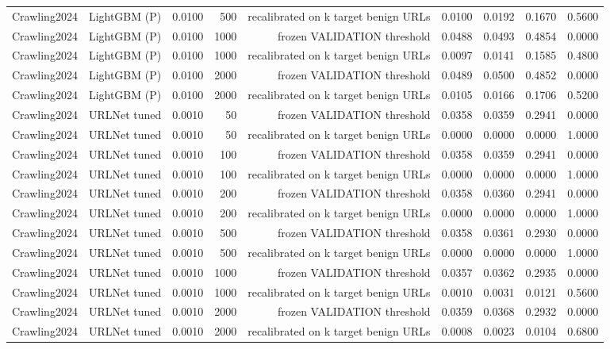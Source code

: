 \begin{table}[t]
\begin{tabular}{llrrrrrrr}
Crawling2024 & LightGBM (P) & 0.0100 & 500 & recalibrated on k target benign URLs & 0.0100 & 0.0192 & 0.1670 & 0.5600 \\
Crawling2024 & LightGBM (P) & 0.0100 & 1000 & frozen VALIDATION threshold & 0.0488 & 0.0493 & 0.4854 & 0.0000 \\
Crawling2024 & LightGBM (P) & 0.0100 & 1000 & recalibrated on k target benign URLs & 0.0097 & 0.0141 & 0.1585 & 0.4800 \\
Crawling2024 & LightGBM (P) & 0.0100 & 2000 & frozen VALIDATION threshold & 0.0489 & 0.0500 & 0.4852 & 0.0000 \\
Crawling2024 & LightGBM (P) & 0.0100 & 2000 & recalibrated on k target benign URLs & 0.0105 & 0.0166 & 0.1706 & 0.5200 \\
Crawling2024 & URLNet tuned & 0.0010 & 50 & frozen VALIDATION threshold & 0.0358 & 0.0359 & 0.2941 & 0.0000 \\
Crawling2024 & URLNet tuned & 0.0010 & 50 & recalibrated on k target benign URLs & 0.0000 & 0.0000 & 0.0000 & 1.0000 \\
Crawling2024 & URLNet tuned & 0.0010 & 100 & frozen VALIDATION threshold & 0.0358 & 0.0359 & 0.2941 & 0.0000 \\
Crawling2024 & URLNet tuned & 0.0010 & 100 & recalibrated on k target benign URLs & 0.0000 & 0.0000 & 0.0000 & 1.0000 \\
Crawling2024 & URLNet tuned & 0.0010 & 200 & frozen VALIDATION threshold & 0.0358 & 0.0360 & 0.2941 & 0.0000 \\
Crawling2024 & URLNet tuned & 0.0010 & 200 & recalibrated on k target benign URLs & 0.0000 & 0.0000 & 0.0000 & 1.0000 \\
Crawling2024 & URLNet tuned & 0.0010 & 500 & frozen VALIDATION threshold & 0.0358 & 0.0361 & 0.2930 & 0.0000 \\
Crawling2024 & URLNet tuned & 0.0010 & 500 & recalibrated on k target benign URLs & 0.0000 & 0.0000 & 0.0000 & 1.0000 \\
Crawling2024 & URLNet tuned & 0.0010 & 1000 & frozen VALIDATION threshold & 0.0357 & 0.0362 & 0.2935 & 0.0000 \\
Crawling2024 & URLNet tuned & 0.0010 & 1000 & recalibrated on k target benign URLs & 0.0010 & 0.0031 & 0.0121 & 0.5600 \\
Crawling2024 & URLNet tuned & 0.0010 & 2000 & frozen VALIDATION threshold & 0.0359 & 0.0368 & 0.2932 & 0.0000 \\
Crawling2024 & URLNet tuned & 0.0010 & 2000 & recalibrated on k target benign URLs & 0.0008 & 0.0023 & 0.0104 & 0.6800 \\

\end{tabular}
\end{table}
